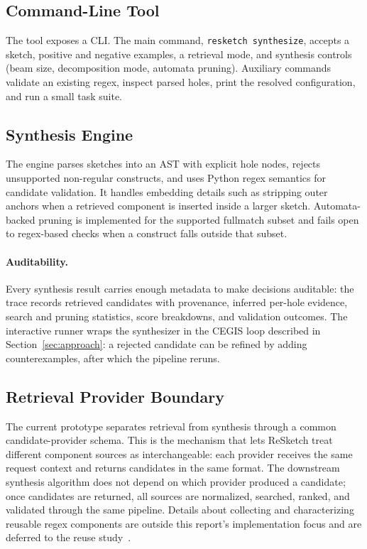 \documentclass[sigconf,nonacm]{acmart}
\begin{document}
\subsection{Command-Line Tool}
The tool exposes a CLI. The main
command, \texttt{resketch synthesize}, accepts a sketch, positive and negative
examples, a retrieval mode, and synthesis controls (beam size, decomposition
mode, automata pruning). Auxiliary commands validate an existing regex, inspect
parsed holes, print the resolved configuration, and run a small task suite.

\subsection{Synthesis Engine}
The engine parses sketches into an AST with explicit hole nodes, rejects
unsupported non-regular constructs, and uses Python regex semantics for
candidate validation. It handles embedding details such as stripping outer
anchors when a retrieved component is inserted inside a larger sketch.
Automata-backed pruning is implemented for the supported fullmatch subset and
fails open to regex-based checks when a construct falls outside that subset.

\paragraph{Auditability.}
Every synthesis result carries enough metadata to make decisions auditable:
the trace records retrieved candidates with provenance, inferred per-hole
evidence, search and pruning statistics, score breakdowns, and validation
outcomes. The interactive runner wraps the synthesizer in the CEGIS loop
described in Section~\ref{sec:approach}: a rejected candidate can be refined
by adding counterexamples, after which the pipeline reruns.

\subsection{Retrieval Provider Boundary}
The current prototype separates retrieval from synthesis through a common
candidate-provider schema. This is the mechanism that lets ReSketch treat
different component sources as interchangeable: each provider receives the
same request context and returns candidates in the same format. The downstream
synthesis algorithm does not depend on which provider produced a candidate;
once candidates are returned, all sources are normalized, searched, ranked,
and validated through the same pipeline. Details about collecting and
characterizing reusable regex components are outside this report's
implementation focus and are deferred to the reuse
study~\cite{cakar2025reuse}.
\end{document}
